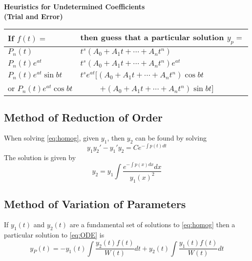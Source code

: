 \documentclass[10pt,portrait, leqno]{article}
\begin{document}
\begin{multicols}{2}
\begin{center}
\textbf{Heuristics for Undetermined Coefficients\\ (Trial and Error)}
\begin{small}
\begin{tabular}{|l|l|}
\hline 
If $f(t)=$ & then guess that a particular solution $y_p=$ \\
\hline
$P_n(t)$ & $t^s (A_0 + A_1 t + \cdots + A_n t^n)$ \\
\hline 
$P_n(t)e^{at}$ & $t^s (A_0 + A_1 t + \cdots + A_n t^n)e^{at}$ \\
\hline
$P_n(t)e^{at}\sin bt$ & $t^s e^{at} [(A_0 + A_1 t + \cdots + A_n t^n)\cos bt$ \\
or $P_n(t)e^{at}\cos bt$ & \ \ \ \ \ $ + (A_0 + A_1 t + \cdots + A_n t^n)\sin bt]$ \\
\hline 
\end{tabular}
\end{small}
\end{center}

\subsection*{Method of Reduction of Order}
When solving \eqref{eq:homog}, given $y_1$, then $y_2$ can be found by solving
\begin{equation}
y_1 y_2' - y_1'y_2 = Ce^{-\int p(t) dt}
\end{equation}
The solution is given by 
\begin{equation}\label{eq:ROE}
y_2 = y_1\int \dfrac{e^{-\int p(x) dx} dx}{y_1(x)^2}
\end{equation}

\subsection*{Method of Variation of Parameters}
If $y_1(t)$ and $y_2(t)$ are a fundamental set of solutions to \eqref{eq:homog} then a particular solution to \eqref{eq:ODE} is 
\begin{equation}
y_P(t) = -y_1(t) \int \dfrac{y_2(t) f(t)}{W(t)}dt
+ y_2(t) \int \dfrac{y_1(t) f(t)}{W(t)}dt 
\end{equation}


\end{multicols}
\end{document}
